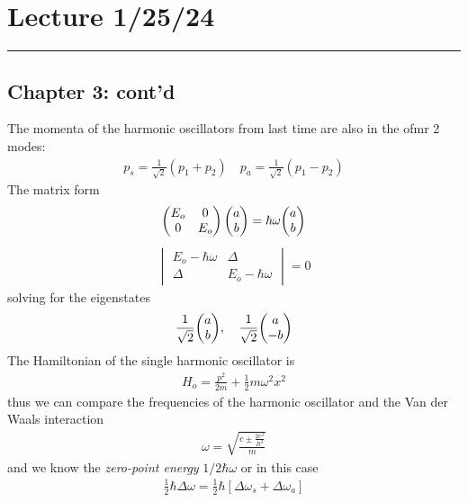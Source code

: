 \documentclass[../main.tex]{subfiles}
\begin{document}
\pagebreak
\section{Lecture 1/25/24}
\hrule \vspace{10px}

\subsection*{Chapter 3: cont'd}

The momenta of the harmonic oscillators from last time are also in the ofmr 2 modes:
\begin{align*}
    p_s = \frac{1}{\sqrt{2}}(p_1 + p_2) \quad p_a = \frac{1}{\sqrt{2}}(p_1 - p_2)
\end{align*}
The matrix form
\begin{align*}
    \begin{pmatrix}
        E_o & 0 \\
        0 & E_o
    \end{pmatrix} \mqty(a \\ b)
    = \hbar \omega \mqty(a \\ b)
\end{align*}
\begin{align*}
    \begin{vmatrix}
        E_o - \hbar \omega & \Delta \\
        \Delta & E_o - \hbar \omega
    \end{vmatrix}
    = 0
\end{align*}
solving for the eigenstates
\begin{align*}
    \frac{1}{\sqrt{2}} \mqty(a \\ b), \quad \frac{1}{\sqrt{2}} \mqty(a \\ -b)
\end{align*}
The Hamiltonian of the single harmonic oscillator is
\begin{align*}
    H_o = \frac{p^2}{2m} + \frac{1}{2} m \omega^2 x^2
\end{align*}
thus we can compare the frequencies of the harmonic oscillator and the Van der Waals interaction
\begin{align*}
    \omega = \sqrt{\frac{c \pm \frac{2e^2}{R^3}}{m}}
\end{align*}
and we know the \emph{zero-point energy} $1/2 \hbar \omega$ or in this case 
\begin{align*}
    \frac{1}{2} \hbar \Delta \omega = \frac{1}{2} \hbar [\Delta \omega_s + \Delta \omega_a]
\end{align*}
\end{document}
